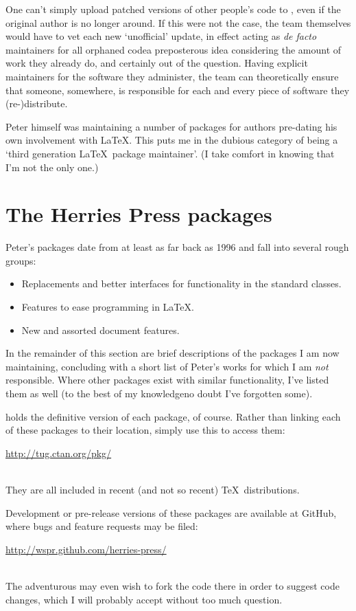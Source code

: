 \documentclass[final]{ltugboat}
\begin{document}
One can't simply upload patched versions of other people's code to , even if the original author is no longer around. If this were not the case, the  team themselves would have to vet each new `unofficial' update, in effect acting as \emph{de facto} maintainers for all orphaned code\Dash a preposterous idea considering the amount of work they already do, and certainly out of the question. Having explicit maintainers for the software they administer, the  team can theoretically ensure that someone, somewhere, is responsible for each and every piece of software they (re-)distribute.

Peter himself was maintaining a number of packages for authors pre-dating his own involvement with \LaTeX. This puts me in the dubious category of being a `third generation \LaTeX\ package maintainer'. (I take comfort in knowing that I'm not the only one.)

\section{The Herries Press packages}

Peter's packages date from at least as far back as 1996 and fall into several rough groups:
\begin{itemize}
\item Replacements and better interfaces for functionality in the standard classes.
\item Features to ease programming in \LaTeX.
\item New and assorted document features.
\end{itemize}
In the remainder of this section are brief descriptions of the packages I am now maintaining, concluding with a short list of Peter's works for which I am \emph{not} responsible. Where other packages exist with similar functionality, I've listed them as well (to the best of my knowledge\Dash no doubt I've forgotten some).

 holds the definitive version of each package, of course. Rather than linking each of these packages to their  location, simply use this  to access them:\\
\centerline{\url{http://tug.ctan.org/pkg/}}\\
They are all included in recent (and not so recent) \TeX\ distributions.

Development or pre-release versions of these packages are available at GitHub, where bugs and feature requests may be filed:\\
\centerline{\url{http://wspr.github.com/herries-press/}}\\
The adventurous may even wish to fork the code there in order to suggest code changes, which I will probably accept without too much question.%
\end{document}
